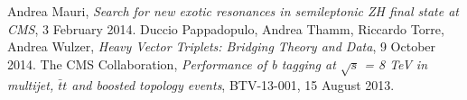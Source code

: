 \documentclass[12pt]{article} %
\begin{document}
\begin{thebibliography}{9} %

 Andrea Mauri, \emph{Search for new exotic resonances in semileptonic ZH final state at CMS}, 3 February 2014.
 Duccio Pappadopulo, Andrea Thamm, Riccardo Torre, Andrea Wulzer, \emph{Heavy Vector Triplets: Bridging Theory and Data}, 9 October 2014.
 The CMS Collaboration, \emph{Performance of b tagging at $\sqrt{s}$ = 8 TeV in multijet, $\bar{t}t$ and boosted topology events}, BTV-13-001, 15 August 2013.


\end{thebibliography}

\end{document}
